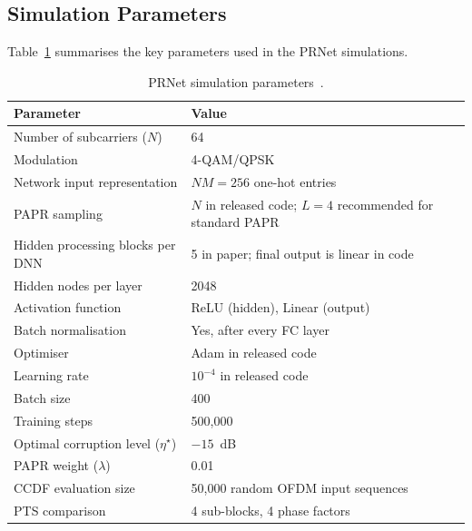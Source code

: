 \subsection{Simulation Parameters}

Table~\ref{tab:prnet_params} summarises the key parameters used in the
PRNet simulations.

\begin{table}[H]
    \centering
    \caption{PRNet simulation parameters~\cite{kim2017novel}.}
    \label{tab:prnet_params}
    \begin{tabularx}{\linewidth}{@{} l X @{}}
        \toprule
        \textbf{Parameter} & \textbf{Value} \\
        \midrule
        Number of subcarriers ($N$)        & 64 \\
        Modulation                         & 4-QAM/QPSK \\
        Network input representation       & $NM=256$ one-hot entries \\
        PAPR sampling                      & $N$ in released code; $L=4$ recommended for standard PAPR \\
        Hidden processing blocks per DNN   & 5 in paper; final output is linear in code \\
        Hidden nodes per layer             & 2048 \\
        Activation function                & ReLU (hidden), Linear (output) \\
        Batch normalisation                & Yes, after every FC layer \\
        Optimiser                          & Adam in released code \\
        Learning rate                      & $10^{-4}$ in released code \\
        Batch size                         & 400 \\
        Training steps                     & 500{,}000 \\
        Optimal corruption level ($\eta^\star$) & $-15$~dB \\
        PAPR weight ($\lambda$)            & 0.01 \\
        CCDF evaluation size               & 50{,}000 random OFDM input sequences \\
        PTS comparison                     & 4 sub-blocks, 4 phase factors \\
        \bottomrule
    \end{tabularx}
\end{table}


